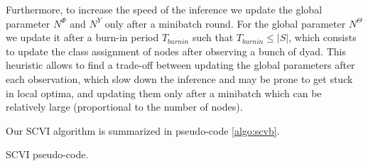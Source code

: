 Furthermore, to increase the speed of the inference we update the global parameter $N^\Phi$ and $N^Y$ only after a minibatch round. For the global parameter $N^\Theta$ we update it after a burn-in period $T_{burnin}$ such that $T_{burnin} \leq |S|$, which consists to update the class assignment of nodes after observing a bunch of dyad. This heuristic allows to find a trade-off between updating the global parameters after each observation, which slow down the inference and may be prone to get stuck in local optima, and updating them only after a minibatch which can be relatively large (proportional to the number of nodes).


Our SCVI algorithm is summarized in pseudo-code \ref{algo:scvb}.

\begin{algorithm}
\caption{SCVI pseudo-code.}
\label{algo:scvb}
\end{algorithm}

